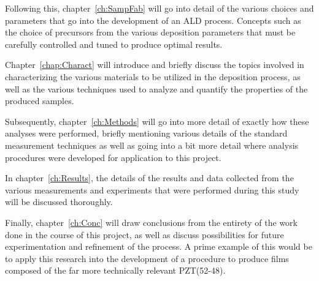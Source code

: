 Following this, chapter~\ref{ch:SampFab} will go into detail of the various choices and parameters that go into the development of an ALD process. Concepts such as the choice of precursors from the various deposition parameters that must be carefully controlled and tuned to produce optimal results. 

Chapter~\ref{chap:Charact} will introduce and briefly discuss the topics involved in characterizing the various materials to be utilized in the deposition process, as well as the various techniques used to analyze and quantify the properties of the produced samples. 

Subsequently, chapter~\ref{ch:Methods} will go into more detail of exactly how these analyses were performed, briefly mentioning various details of the standard measurement techniques as well as going into a bit more detail where analysis procedures were developed for application to this project. 

In chapter~\ref{ch:Results}, the details of the results and data collected from the various measurements and experiments that were performed during this study will be discussed thoroughly.  

Finally, chapter~\ref{ch:Conc} will draw conclusions from the entirety of the work done in the course of this project, as well as discuss possibilities for future experimentation and refinement of the process. A prime example of this would be to apply this research into the development of a procedure to produce films composed of the far more technically relevant PZT(52-48). 


%
